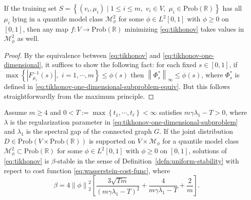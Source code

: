\documentclass[letterpaper]{article} %
\begin{document}
\begin{lemma}
  \label{lem:apriori-estimates}
  If the training set $S=\left\{ \left( v_i,\mu_i \right)\mid 1\leq i\leq m,\,\,v_i\in V,\,\,\mu_i\in\mathrm{Prob}\left( \mathbb{R} \right) \right\}$ has all $\mu_i$ lying in a quantile model class $\mathcal{M}_{\phi}^2$ for some $\phi\in L^2 \left[ 0,1 \right]$ with $\phi\geq 0$ on $\left[ 0,1 \right]$, then any map $f:V\rightarrow\mathrm{Prob}\left( \mathbb{R} \right)$ minimizing \eqref{eq:tikhonov} takes values in $\mathcal{M}_{\phi}^2$ as well.
\end{lemma}

\begin{proof}
  By the equivalence between \eqref{eq:tikhonov} and \eqref{eq:tikhonov-one-dimensional}, it suffices to show the following fact: for each fixed $s\in \left[ 0,1 \right]$, if $\max \left\{ \left|F_{\mu_i}^{-1} \left( s \right)\right|,\,\,i=1,\cdots,m\right\}\leq \phi \left( s \right)$ then $\left\|\Phi_s^{*}\right\|_{\infty}\leq \phi \left( s \right)$, where $\Phi_s^{*}$ is defined in \eqref{eq:tikhonov-one-dimensional-subproblem-equiv}. But this follows straightforwardly from the maximum principle.
\end{proof}

\begin{proposition}
  \label{prop:alg-stability-slp}
  Assume $m\geq 4$ and $0<T:=\max \left\{ t_1,\cdots,t_{\ell} \right\}<\infty$ satisfies $m\gamma\lambda_1-T>0$, where $\lambda$ is the regularization parameter in \eqref{eq:tikhonov-one-dimensional-subproblem} and $\lambda_1$ is the spectral gap of the connected graph $G$. If the joint distribution $D\in\mathrm{Prob}\left( V\times \mathrm{Prob}\left( \mathbb{R} \right) \right)$ is supported on $V\times \mathcal{M}_{\phi}$ for a quantile model class $\mathcal{M}_{\phi}^2\subset \mathrm{Prob}\left( \mathbb{R} \right)$ for some $\phi\in L^2 \left[ 0,1 \right]$ with $\phi\geq 0$ on $\left[ 0,1 \right]$, solutions of \eqref{eq:tikhonov} is $\beta$-stable in the sense of Definition~\ref{defn:uniform-stability} with repect to cost function \eqref{eq:wasserstein-cost-func}, where
  \begin{equation*}
    \beta=4\left\| \phi \right\|_2^2\left[\frac{3\sqrt{Tm}}{\left( m\gamma\lambda_1-T \right)^2}+\frac{4}{m\gamma\lambda_1-T}+\frac{2}{m}\right].
  \end{equation*}
\end{proposition}
\end{document}
